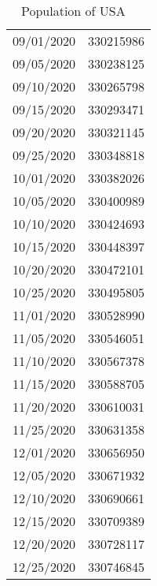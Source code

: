 \begin{table}[h]
\begin{tabular}{lr}
        09/01/2020		&		330215986 \\
        09/05/2020		&		330238125 \\
        09/10/2020		&		330265798 \\
        09/15/2020		&		330293471 \\
        09/20/2020		&		330321145 \\
        09/25/2020		&		330348818 \\
        10/01/2020		&		330382026 \\
        10/05/2020		&		330400989 \\
        10/10/2020		&		330424693 \\
        10/15/2020		&		330448397 \\
        10/20/2020		&		330472101 \\
        10/25/2020		&		330495805 \\
        11/01/2020		&		330528990 \\
        11/05/2020		&		330546051 \\
        11/10/2020		&		330567378 \\
        11/15/2020		&		330588705 \\
        11/20/2020		&		330610031 \\
        11/25/2020		&		330631358 \\
        12/01/2020		&		330656950 \\
        12/05/2020		&		330671932 \\
        12/10/2020		&		330690661 \\
        12/15/2020		&		330709389 \\
        12/20/2020		&		330728117 \\
        12/25/2020		&		330746845 \\
        \bottomrule
        \end{tabular}
        \caption{Population of USA ~\cite{pop-clock}}
        \label{tab:usa_population}
\end{table}


